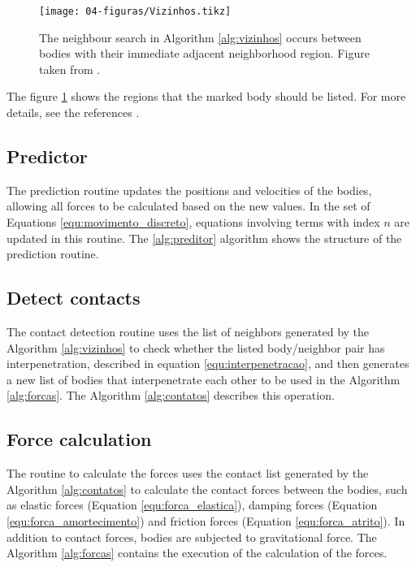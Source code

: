 

\begin{figure}[H]
    \centering
    \texttt{[image: 04-figuras/Vizinhos.tikz]}
    \caption[Neighbor search.]{The neighbour search in Algorithm \ref{alg:vizinhos} occurs between bodies with their immediate adjacent neighborhood region. Figure taken from \cite{Dissertacao}.}
    \label{fig:vizinhos}
\end{figure}

    The figure \ref{fig:vizinhos} shows the regions that the marked body should be listed. For more details, see the references \cite{Dissertacao, Computer_Simulation_of_Liquids}. 

\subsection{Predictor}
    The prediction routine updates the positions and velocities of the bodies, allowing all forces to be calculated based on the new values. In the set of Equations \ref{equ:movimento_discreto}, equations involving terms with index $n$ are updated in this routine. The \ref{alg:preditor} algorithm shows the structure of the prediction routine.



\subsection{Detect contacts}
    The contact detection routine uses the list of neighbors generated by the Algorithm \ref{alg:vizinhos} to check whether the listed body/neighbor pair has interpenetration, described in equation \ref{equ:interpenetracao}, and then generates a new list of bodies that interpenetrate each other to be used in the Algorithm \ref{alg:forcas}. The Algorithm \ref{alg:contatos} describes this operation.



\subsection{Force calculation}
    The routine to calculate the forces uses the contact list generated by the Algorithm \ref{alg:contatos} to calculate the contact forces between the bodies, such as elastic forces (Equation \ref{equ:forca_elastica}), damping forces (Equation \ref{equ:forca_amortecimento}) and friction forces (Equation \ref{equ:forca_atrito}). In addition to contact forces, bodies are subjected to gravitational force. The Algorithm \ref{alg:forcas} contains the execution of the calculation of the forces. 

